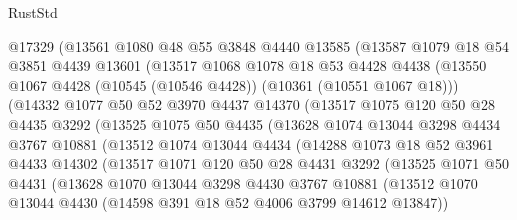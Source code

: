 \begin{lexlean}{RustStd}
\begin{coremodule}
            @17329
            (@13561
              @1080
              @48
              @55
              @3848
              @4440
              @13585
              (@13587
                @1079
                @18
                @54
                @3851
                @4439
                @13601
                (@13517
                  @1068
                  @1078
                  @18
                  @53
                  @4428
                  @4438
                  (@13550 @1067 @4428 (@10545 (@10546 @4428)) (@10361 (@10551 @1067 @18)))
                  (@14332
                    @1077
                    @50
                    @52
                    @3970
                    @4437
                    @14370
                    (@13517
                      @1075
                      @120
                      @50
                      @28
                      @4435
                      @3292
                      (@13525
                        @1075
                        @50
                        @4435
                        (@13628
                          @1074
                          @13044
                          @3298
                          @4434
                          @3767
                          @10881
                          (@13512
                            @1074
                            @13044
                            @4434
                            (@14288
                              @1073
                              @18
                              @52
                              @3961
                              @4433
                              @14302
                              (@13517
                                @1071
                                @120
                                @50
                                @28
                                @4431
                                @3292
                                (@13525
                                  @1071
                                  @50
                                  @4431
                                  (@13628
                                    @1070
                                    @13044
                                    @3298
                                    @4430
                                    @3767
                                    @10881
                                    (@13512
                                      @1070
                                      @13044
                                      @4430
                                      (@14598 @391 @18 @52 @4006 @3799 @14612 @13847))

\end{coremodule}
\end{lexlean}
